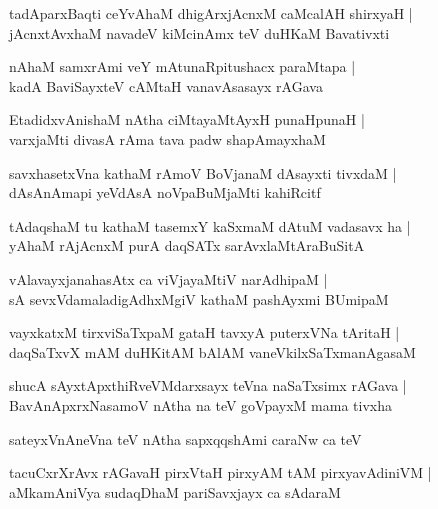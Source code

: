 \begin{shloka}
tadAparxBaqti ceYvAhaM dhigArxjAcnxM caMcalAH shirxyaH |\\
jAcnxtAvxhaM navadeV kiMcinAmx teV duHKaM Bavativxti
\end{shloka}

\begin{shloka}
nAhaM samxrAmi veY mAtunaRpitushacx paraMtapa |\\
kadA BaviSayxteV cAMtaH vanavAsasayx rAGava
\end{shloka}

\begin{shloka}
EtadidxvAnishaM nAtha ciMtayaMtAyxH punaHpunaH |\\
varxjaMti divasA rAma tava padw shapAmayxhaM 
\end{shloka}

\begin{shloka}
savxhasetxVna kathaM rAmoV BoVjanaM dAsayxti tivxdaM |\\
dAsAnAmapi yeVdAsA noVpaBuMjaMti kahiRcitf
\end{shloka}

\begin{shloka}
tAdaqshaM tu kathaM tasemxY kaSxmaM dAtuM vadasavx ha |\\
yAhaM rAjAcnxM purA daqSATx sarAvxlaMtAraBuSitA
\end{shloka}

\begin{shloka}
vAlavayxjanahasAtx ca viVjayaMtiV narAdhipaM |\\
sA sevxVdamaladigAdhxMgiV kathaM pashAyxmi BUmipaM
\end{shloka}

\begin{shloka}
vayxkatxM tirxviSaTxpaM gataH tavxyA puterxVNa tAritaH |\\
daqSaTxvX mAM duHKitAM bAlAM vaneVkilxSaTxmanAgasaM 
\end{shloka}

\begin{shloka}
shucA sAyxtApxthiRveVMdarxsayx teVna naSaTxsimx rAGava |\\
BavAnApxrxNasamoV nAtha na teV goVpayxM mama tivxha 
\end{shloka}

\begin{shloka}
sateyxVnAneVna teV nAtha sapxqqshAmi caraNw ca teV 
\end{shloka}

\begin{shloka}
tacuCxrXrAvx rAGavaH pirxVtaH pirxyAM tAM pirxyavAdiniVM |\\
aMkamAniVya sudaqDhaM pariSavxjayx ca sAdaraM 
\end{shloka}

